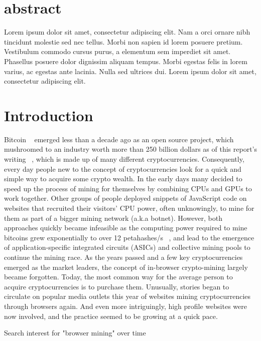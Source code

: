 \section{abstract}
Lorem ipsum dolor sit amet, consectetur adipiscing elit. Nam a orci ornare nibh tincidunt molestie sed nec tellus. Morbi non sapien id lorem posuere pretium. Vestibulum commodo cursus purus, a elementum sem imperdiet sit amet. Phasellus posuere dolor dignissim aliquam tempus. Morbi egestas felis in lorem varius, ac egestas ante lacinia. Nulla sed ultrices dui. Lorem ipsum dolor sit amet, consectetur adipiscing elit. 

\section{Introduction}

Bitcoin ~\cite{nakamoto2008bitcoin} emerged less than a decade ago as an open source project, which mushroomed to an industry worth more than 250 billion dollars as of this report's writing ~\cite{coinmarketcap}, which is made up of many different cryptocurrencies. Consequently, every day people new to the concept of cryptocurrencies look for a quick and simple way to acquire some crypto wealth. In the early days many decided to speed up the process of mining for themselves by combining CPUs and GPUs to work together. Other groups of people deployed snippets of JavaScript code on websites that recruited their visitors’ CPU power, often unknowingly, to mine for them as part of a bigger mining network (a.k.a botnet). However, both approaches quickly became infeasible as the computing power required to mine bitcoins grew exponentially to over 12 petahashes/s ~\cite{blockchaininfohashrate}, and lead to the emergence of application-specific integrated circuits (ASICs) and collective mining pools to continue the mining race. As the years passed and a few key cryptocurrencies emerged as the market leaders, the concept of in-browser crypto-mining largely became forgotten. Today, the most common way for the average person to acquire cryptocurrencies is to purchase them. Unusually, stories began to circulate on popular media outlets this year of websites mining cryptocurrencies through browsers again. And even more intriguingly, high profile websites were now involved, and the practice seemed to be growing at a quick pace.

\begin{center}
	\caption{Search interest for "browser mining" over time}
\end{center}

